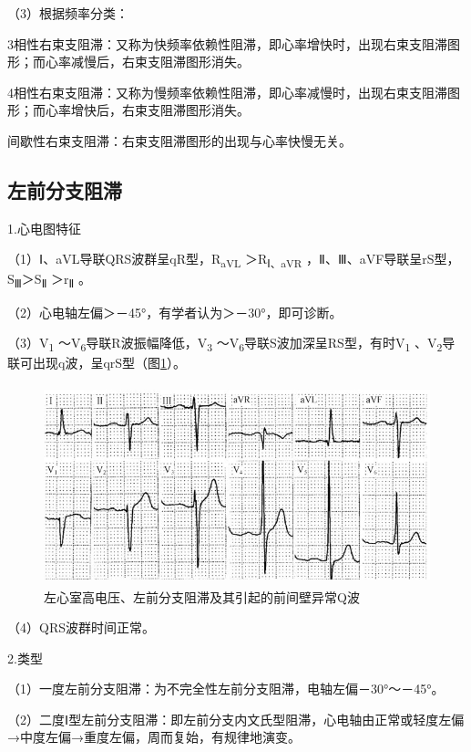 （3）根据频率分类：

3相性右束支阻滞：又称为快频率依赖性阻滞，即心率增快时，出现右束支阻滞图形；而心率减慢后，右束支阻滞图形消失。

4相性右束支阻滞：又称为慢频率依赖性阻滞，即心率减慢时，出现右束支阻滞图形；而心率增快后，右束支阻滞图形消失。

间歇性右束支阻滞：右束支阻滞图形的出现与心率快慢无关。

\protect\hypertarget{text00028.htmlux5cux23subid346}{}{}

\subsection{左前分支阻滞}

1.心电图特征

（1）Ⅰ、aVL导联QRS波群呈qR型，R\textsubscript{aVL}
＞R\textsubscript{Ⅰ、aVR} ，Ⅱ、Ⅲ、aVF导联呈rS型，S\textsubscript{Ⅲ}＞S\textsubscript{Ⅱ} ＞r\textsubscript{Ⅱ} 。

（2）心电轴左偏＞－45°，有学者认为＞－30°，即可诊断。

（3）V\textsubscript{1} ～V\textsubscript{6}导联R波振幅降低，V\textsubscript{3} ～V\textsubscript{6}导联S波加深呈RS型，有时V\textsubscript{1} 、V\textsubscript{2}导联可出现q波，呈qrS型（图\ref{fig21-7}）。

\begin{figure}[!htbp]
 \centering
 \includegraphics[width=4.625in,height=2.27083in]{./images/Image00355.jpg}
 \captionsetup{justification=centering}
 \caption{左心室高电压、左前分支阻滞及其引起的前间壁异常Q波}
 \label{fig21-7}
  \end{figure} 

（4）QRS波群时间正常。

2.类型

（1）一度左前分支阻滞：为不完全性左前分支阻滞，电轴左偏－30°～－45°。

（2）二度Ⅰ型左前分支阻滞：即左前分支内文氏型阻滞，心电轴由正常或轻度左偏→中度左偏→重度左偏，周而复始，有规律地演变。

